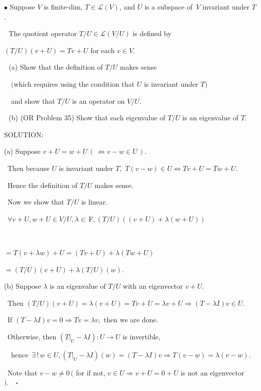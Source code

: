 \documentclass[a4paper, 11pt, UTF8]{article}
\def\Lm{\mathcal{L}}
\def\Fbfc{$\,{\timesbf F}$}
\begin{document}
\begin{large}
{\small $\bullet$} {\timessl\Large 
Suppose $V$ is finite-dim, $T\in\Lm(V)$, and $U$ is a subspace of \,$V$ invariant under $T$.}\par\,\,
{\timessl\Large The quotient operator $T/U\in\Lm(V/U)$ is defined by}\par \centerline{\timessl\Large $(T/U)(v + U) = Tv + U$ for each $v\in V$.}\par\,\,
(a) {\timessl\Large Show that the definition of $T/U$ makes sense}\par\quad\,\,\,\,
$(${\timessl\Large which requires using the condition that $U$ is invariant under $T$}$)$\par\quad\,\,\,\,
{\timessl\Large and show that $T/U$ is an operator on $V/U$.}\par\,\,
(b) {\normalsize (O{\footnotesize R} Problem 35)} {\timessl\Large Show that each eigenvalue of $T/U$ is an eigenvalue of $T$.
}\par
{\timesbf S\footnotesize{OLUTION:}}\par\quad
(a) Suppose $v+U=w+U\,(\,\Longleftrightarrow v-w\in U\,).$\par\qquad\,
Then because $U$ is invariant under $T,$ $T(v-w)\in U\Longleftrightarrow Tv+U=Tw+U.$\par\qquad\,
Hence the definition of $T/U$ makes sense.\par\qquad\,
Now we show that $T/U$ is linear.\par\qquad\,
$\forall v+U,w+U\in V/U,\lambda\in\Fbfc,(T/U)((v+U)+\lambda(w+U))$\par\,\,
\centerline{$=T(v+\lambda w)+U=(Tv+U)+\lambda(Tw+U)$}\par
\centerline{$=(T/U)(v+U)+\lambda(T/U)(w).$\qquad\qquad\,\,\,}\par\quad
(b) Suppose $\lambda$ is an eigenvalue of $T/U$ with an eigenvector $v+U.$\par\qquad\,
Then $(T/U)(v+U)=\lambda(v+U)=Tv+U=\lambda v+U\Rightarrow (T-\lambda I)v\in U.$\par\qquad\,
If $(T-\lambda I)v=0\Rightarrow Tv=\lambda v,$ then we are done.\par\qquad\,
Otherwise, then $(T|_U-\lambda I):U\rightarrow U$ is invertible,\par\qquad\qquad\qquad\,\,\,\,
hence $\,\exists\,!\,w\in U,(T|_U-\lambda I)(w)=(T-\lambda I) v\Rightarrow T(v-w)=\lambda (v-w).$\par\qquad\,
Note that $v-w\neq 0\,($ for if not, $v\in U\Rightarrow v+U=0+U$ is not an eigenvector $).\quad\square$\par\qquad\,

\end{large}
\end{document}

